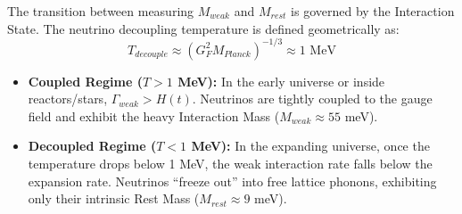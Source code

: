 The transition between measuring $M_{weak}$ and $M_{rest}$ is governed by the Interaction State. The neutrino decoupling temperature is defined geometrically as:
\begin{equation}
    T_{decouple} \approx (G_F^2 M_{Planck})^{-1/3} \approx 1 \text{ MeV}
\end{equation}

\begin{itemize}
    \item \textbf{Coupled Regime ($T > 1$ MeV):} In the early universe or inside reactors/stars, $\Gamma_{weak} > H(t)$. Neutrinos are tightly coupled to the gauge field and exhibit the heavy Interaction Mass ($M_{weak} \approx 55$ meV).
    \item \textbf{Decoupled Regime ($T < 1$ MeV):} In the expanding universe, once the temperature drops below 1 MeV, the weak interaction rate falls below the expansion rate. Neutrinos ``freeze out'' into free lattice phonons, exhibiting only their intrinsic Rest Mass ($M_{rest} \approx 9$ meV).
\end{itemize}
